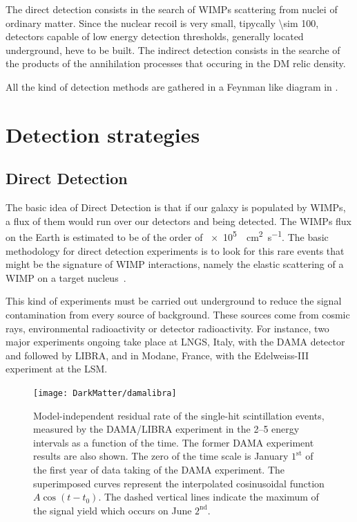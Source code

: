 The direct detection consists in the search of WIMPs scattering from nuclei of ordinary matter. Since the nuclear recoil is very small, tipycally \SI{\sim 100}{\kev}, detectors capable of low energy detection thresholds, generally located underground, heve to be built. The indirect detection consists in the searche of the products of the annihilation processes that occuring in the DM relic density.

All the kind of detection methods are gathered in a Feynman like diagram in \Fig{\ref{fig:detection}}.

\section{Detection strategies}

\subsection{Direct Detection}
The basic idea of Direct Detection is that if our galaxy is populated by WIMPs, a flux of them would run over our detectors and being detected. The WIMPs flux on the Earth is estimated to be of the order of \SI{e5}{\per \cm\squared\per\s}. The basic methodology for direct detection experiments is to look for this rare events that might be the signature of WIMP interactions, namely the elastic scattering of a WIMP on a target nucleus~\cite{snowmass}.

This kind of experiments must be carried out underground to reduce the signal contamination from every source of background. These sources come from cosmic rays, environmental radioactivity or detector radioactivity. For instance, two major experiments ongoing take place at LNGS, Italy, with the DAMA detector and followed by LIBRA, and in Modane, France, with the Edelweiss-III experiment at the LSM.
\begin{figure}[t]
\centering
\texttt{[image: DarkMatter/damalibra]}
\caption{Model-independent residual rate of the single-hit scintillation events, measured by the DAMA/LIBRA experiment in the \SIrange{2}{5}{\kev} energy intervals as a function of the time. The former DAMA experiment results are also shown. The zero of the time scale is January $1^{\text{st}}$ of the first year of data taking of the DAMA experiment. The superimposed curves represent the interpolated cosinusoidal function $A\cos{(t-t_0)}$. The dashed vertical lines indicate the maximum of the signal yield which occurs on June $2^{\text{nd}}$.}

\label{fig:damalibra}
\end{figure}

